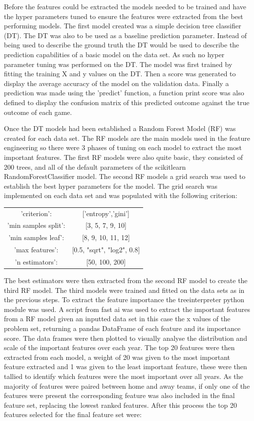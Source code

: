 \documentclass{imc-inf}
\begin{document}
	Before the features could be extracted the models needed to be trained and have the hyper parameters tuned to ensure the features were extracted from the best performing models. The first model created was a simple decision tree classifier (DT). The DT was also to be used as a baseline prediction parameter. Instead of being used to describe the ground truth the DT would be used to describe the prediction capabilities of a basic model on the data set. As such no hyper parameter tuning was performed on the DT. The model was first trained by fitting the training X and y values on the DT. Then a score was generated to display the average accuracy of the model on the validation data. Finally a prediction was made using the 'predict' function, a function print score was also defined to display the confusion matrix of this predicted outcome against the true  outcome of each game. 
	
	Once the DT models had been established a Random Forest Model (RF) was created for each data set. The RF models are the main models used in the feature engineering so there were 3 phases of tuning on each model to extract the most important features.
	The first RF models were also quite basic, they consisted of 200 trees, and all of the default parameters of the scikitlearn RandomForestClassifier model. 
	The second RF models a grid search was used to establish the best hyper parameters for the model. The grid search was implemented on each data set and was populated with the following criterion: 
	\begin{center}
	\begin{tabular}{c c}
		'criterion': &['entropy','gini'] \\
		'min samples split': & [3, 5, 7, 9, 10] \\
		'min samples leaf': & [8, 9, 10, 11, 12] \\
		'max features': & [0.5, "sqrt", "log2", 0.8] \\
 		'n estimators': & [50, 100, 200]
	\end{tabular}
	\end{center}
	
	The best estimators were then extracted from the second RF model to create the third RF model. The third models were trained and fitted on the data sets as in the previous steps. To extract the feature importance the treeinterpreter python module was used. A script from fast ai was used to extract the important features from a RF model given an inputted data set in this case the x values of the problem set, returning a pandas DataFrame of each feature and its importance score. The data frames were then plotted to visually analyse the distribution and scale of the important features over each year. The top 20 features were then extracted from each model, a weight of 20 was given to the most important feature extracted and 1 was given to the least important feature, these were then tallied to identify which features were the most important over all years. As the majority of features were paired between home and away teams, if only one of the features were present the corresponding feature was also included in the final feature set, replacing the lowest ranked features. After this process the top 20 features selected for the final feature set were: 
	
\end{document}
